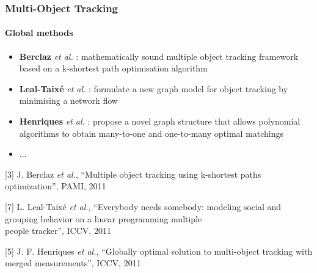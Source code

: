 \begin{frame}
	\frametitle{Multi-Object Tracking}
	\framesubtitle{Global methods}
	
	\Large
	
	\vspace{0.05cm}
	
	\begin{itemize}
		\item \textbf{Berclaz} \emph{et al.} \cite{Berclaz11}: mathematically sound multiple object
			  tracking framework based on a k-shortest path optimisation algorithm
		\item \textbf{Leal-Taix{\'e}} \emph{et al.} \cite{Leal11}: formulate a new graph model for
			  object tracking by minimising a network flow
		\item \textbf{Henriques} \emph{et al.} \cite{Henriques11}: propose a novel graph structure
			  that allows polynomial algorithms to obtain many-to-one and one-to-many optimal matchings
		\item ...
	\end{itemize}
	
	\vspace{0.15cm}
	
	\tiny
	
	[3] J. Berclaz \emph{et al.}, ``Multiple object tracking using k-shortest paths optimization'',
		PAMI, 2011
	
	\vspace{0.05cm}
	
	[7] L. Leal-Taix{\'e} \emph{et al.}, ``Everybody needs somebody: modeling social and grouping
		behavior on a linear programming multiple\\ \hspace{0.25cm} people tracker'', ICCV, 2011
	
	\vspace{-0.19cm}
	
	[5] J. F. Henriques \emph{et al.}, ``Globally optimal solution to multi-object tracking with merged
		measurements'', ICCV, 2011
\end{frame}

